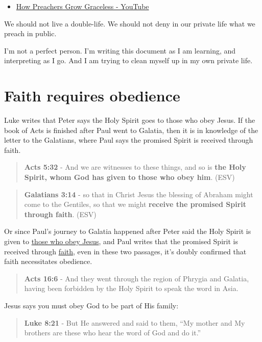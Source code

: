 \documentclass[11pt]{article}
\begin{document}
\begin{itemize}
\item \href{https://www.youtube.com/watch?v=alOI2zxIPgc}{How Preachers Grow Graceless - YouTube}
\end{itemize}

We should not live a double-life.
We should not deny in our private life what we preach in public.

I'm not a perfect person. I'm writing this document as I am learning, and interpreting as I go.
And I am trying to clean myself up in my own private life.

\section{Faith requires obedience}
\label{sec:org1ab4d79}
Luke writes that Peter says the Holy Spirit goes to those who obey Jesus.
If the book of Acts is finished after Paul went to Galatia, then it is in knowledge of the letter to the Galatians, where Paul says the promised Spirit is received through faith.

\begin{quote}
\textbf{Acts 5:32} - And we are witnesses to these things, and so is \textbf{the Holy Spirit, whom God has given to those who obey him}. (ESV)
\end{quote}

\begin{quote}
\textbf{Galatians 3:14} - so that in Christ Jesus the blessing of Abraham might come to the Gentiles, so that we might \textbf{receive the promised Spirit through faith}. (ESV)
\end{quote}

Or since Paul's journey to Galatia happened after Peter said the Holy Spirit is given to \uline{those who obey Jesus}, and Paul writes that the promised Spirit is received through \uline{faith}, even in these two passages, it's doubly confirmed that faith necessitates obedience.

\begin{quote}
\textbf{Acts 16:6} - And they went through the region of Phrygia and Galatia, having been forbidden by the Holy Spirit to speak the word in Asia.
\end{quote}

Jesus says you must obey God to be part of His family:

\begin{quote}
\textbf{Luke 8:21} - But He answered and said to them, “My mother and My brothers are these who hear the word of God and do it.”
\end{quote}
\end{document}
